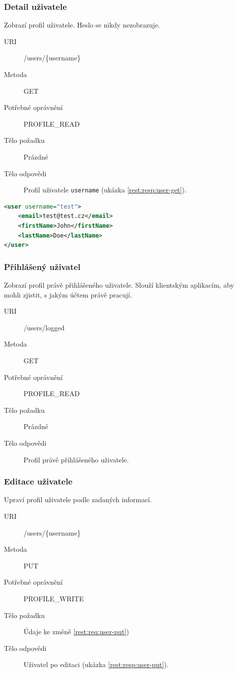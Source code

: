 \documentclass[thesis=M,czech]{FITthesis}[2014/05/6]
\begin{document}
\subsubsection{Detail uživatele}
Zobrazí profil uživatele. Heslo se nikdy nezobrazuje.
\begin{description}
  \item[URI] /users/\{username\}
  \item[Metoda] GET
  \item[Potřebné oprávnění] PROFILE\_READ
  \item[Tělo požadku] Prázdné
  \item[Tělo odpovědi] Profil uživatele \texttt{username} (ukázka \ref{rest:resp:user-get}).
\end{description}

\begin{lstlisting}[caption=Tělo odpovědi zdroje /users/\{username\} (GET), label=rest:resp:user-get, language=xml]
<user username="test">
    <email>test@test.cz</email>
    <firstName>John</firstName>
    <lastName>Doe</lastName>
</user>
\end{lstlisting}  

\subsubsection{Přihlášený uživatel}
Zobrazí profil právě přihlášeného uživatele. Slouží klientským aplikacím, aby mohli zjistit, s jakým účtem právě pracují.
\begin{description}
  \item[URI] /users/logged
  \item[Metoda] GET
  \item[Potřebné oprávnění] PROFILE\_READ
  \item[Tělo požadku] Prázdné
  \item[Tělo odpovědi] Profil právě přihlášeného uživatele.
\end{description}

\subsubsection{Editace uživatele}
Upraví profil uživatele podle zadaných informací.
\begin{description}
  \item[URI] /users/\{username\}
  \item[Metoda] PUT
  \item[Potřebné oprávnění] PROFILE\_WRITE
  \item[Tělo požadku] Údaje ke změně \ref{rest:req:user-put})
  \item[Tělo odpovědi] Uživatel po editaci (ukázka \ref{rest:resp:user-put}).
\end{description}
\end{document}
